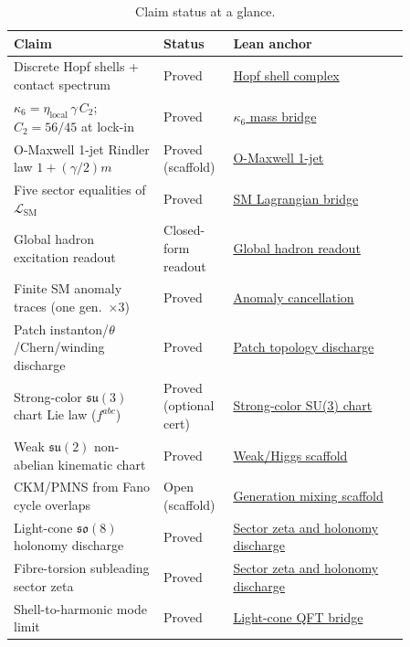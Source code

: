 \documentclass[11pt]{amsart}
\begin{document}
\begin{table}[ht]
  \centering
  \caption{Claim status at a glance.}
  \label{tab:claim-status}
  \footnotesize
  \begin{tabular}{>{\raggedright\arraybackslash}p{0.34\linewidth}>{\raggedright\arraybackslash}p{0.12\linewidth}>{\raggedright\arraybackslash}p{0.40\linewidth}}
    \toprule
    Claim & Status & Lean anchor \\
    \midrule
    Discrete Hopf shells + contact spectrum & Proved & \hyperref[lean:hopf-shell-complex]{Hopf shell complex} \\
    $\kappa_6=\eta_{\mathrm{local}}\,\gamma\,C_2$; $C_2=56/45$ at lock-in & Proved & \hyperref[lean:kappa6-bridge]{$\kappa_6$ mass bridge} \\
    O-Maxwell 1-jet Rindler law $1+(\gamma/2)m$ & Proved (scaffold) & \hyperref[lean:omaxwell-1jet]{O-Maxwell 1-jet} \\
    Five sector equalities of $\mathcal{L}_{\mathrm{SM}}$ & Proved & \hyperref[lean:sm-lagrangian-bridge]{SM Lagrangian bridge} \\
    Global hadron excitation readout & Closed-form readout & \hyperref[lean:global-hadron-readout]{Global hadron readout} \\
    Finite SM anomaly traces (one gen.\ $\times$3) & Proved & \hyperref[lean:anomaly-cancellation]{Anomaly cancellation} \\
    Patch instanton/$\theta$/Chern/winding discharge & Proved & \hyperref[lean:patch-topology]{Patch topology discharge} \\
    Strong-color $\mathfrak{su}(3)$ chart Lie law ($f^{abc}$) & Proved (optional cert) & \hyperref[lean:strong-color-su3]{Strong-color SU(3) chart} \\
    Weak $\mathfrak{su}(2)$ non-abelian kinematic chart & Proved & \hyperref[lean:weak-higgs-scaffold]{Weak/Higgs scaffold} \\
    CKM/PMNS from Fano cycle overlaps & Open (scaffold) & \hyperref[lean:t10-mixing-scaffold]{Generation mixing scaffold} \\
    Light-cone $\mathfrak{so}(8)$ holonomy discharge & Proved & \hyperref[lean:zeta-holonomy-discharge]{Sector zeta and holonomy discharge} \\
    Fibre-torsion subleading sector zeta & Proved & \hyperref[lean:zeta-holonomy-discharge]{Sector zeta and holonomy discharge} \\
    Shell-to-harmonic mode limit & Proved & \hyperref[lean:lightcone-qft-bridge]{Light-cone QFT bridge} \\

\end{tabular}
\end{table}
\end{document}
